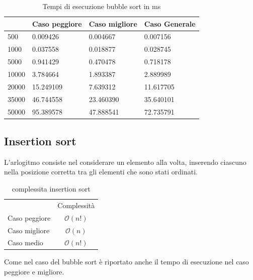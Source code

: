 \documentclass[12pt, a4paper]{report}
\begin{document}
\begin{table}[ht]
\centering
\begin{tabular}{| l | l | l | l |}
\hline
 & Caso peggiore & Caso migliore & Caso Generale \\ \hline
500 & 0.009426 & 0.004667 & 0.007156 \\ \hline
1000 & 0.037558 & 0.018877 & 0.028745 \\ \hline
5000 & 0.941429 & 0.470478 & 0.718178 \\ \hline
10000 & 3.784664 & 1.893387 & 2.889989 \\ \hline
20000 & 15.249109 & 7.639312 & 11.617705 \\ \hline
35000 & 46.744558 & 23.460390 & 35.640101 \\ \hline
50000 & 95.389578 & 47.888541 & 72.735791 \\ \hline
\end{tabular}
\caption{Tempi di esecuzione bubble sort in ms}
\label{Tab:Tempi esecuzione Bubblesort}
\end{table}

\newpage
\subsection{Insertion sort}
L'arlogitmo consiste nel considerare un elemento alla volta, inserendo ciascuno nella posizione corretta tra gli elementi che sono stati ordinati. 
\begin{table}[ht]
	\centering
	\begin{tabular}{lc}
 & Complessità \\
Caso peggiore & $ \mathcal{O}(n!)$ \\
Caso migliore & $ \mathcal{O}(n)$ \\
Caso medio & $ \mathcal{O}(n!)$\\
\end{tabular}
	\caption{complessita insertion sort}
	\label{Tab:CompInsertionSort}
\end{table}


	

Come nel caso del bubble sort è riportato anche il tempo di esecuzione nel caso peggiore e migliore.
\end{document}
